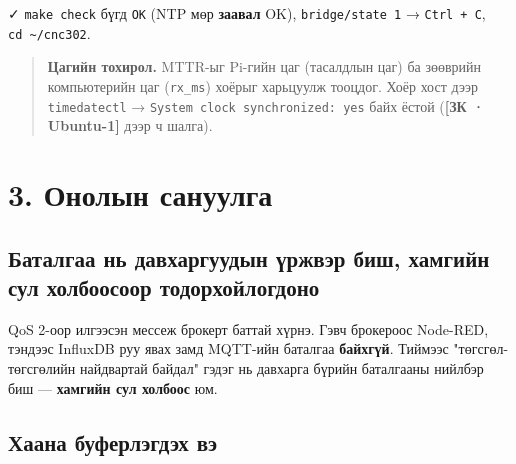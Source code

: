 ✓ \texttt{make\ check} бүгд \texttt{OK} (NTP мөр \textbf{заавал} OK), \texttt{bridge/state\ 1} → \texttt{Ctrl\ +\ C}, \texttt{cd\ \textasciitilde{}/cnc302}.

\begin{quote}
\textbf{Цагийн тохирол.} MTTR-ыг Pi-гийн цаг (тасалдлын цаг) ба зөөврийн компьютерийн цаг (\texttt{rx\_ms}) хоёрыг харьцуулж тооцдог. Хоёр хост дээр \texttt{timedatectl} → \texttt{System\ clock\ synchronized:\allowbreak{}\ yes} байх ёстой (\textbf{{[}ЗК · Ubuntu-1{]}} дээр ч шалга).
\end{quote}

\hypertarget{ux43eux43dux43eux43bux44bux43d-ux441ux430ux43dux443ux443ux43bux433ux430}{%
\section{3. Онолын сануулга}\label{ux43eux43dux43eux43bux44bux43d-ux441ux430ux43dux443ux443ux43bux433ux430}}

\hypertarget{ux431ux430ux442ux430ux43bux433ux430ux430-ux43dux44c-ux434ux430ux432ux445ux430ux440ux433ux443ux443ux434ux44bux43d-ux4afux440ux436ux432ux44dux440-ux431ux438ux448-ux445ux430ux43cux433ux438ux439ux43d-ux441ux443ux43b-ux445ux43eux43bux431ux43eux43eux441ux43eux43eux440-ux442ux43eux434ux43eux440ux445ux43eux439ux43bux43eux433ux434ux43eux43dux43e}{%
\subsection{Баталгаа нь давхаргуудын үржвэр биш, хамгийн сул холбоосоор тодорхойлогдоно}\label{ux431ux430ux442ux430ux43bux433ux430ux430-ux43dux44c-ux434ux430ux432ux445ux430ux440ux433ux443ux443ux434ux44bux43d-ux4afux440ux436ux432ux44dux440-ux431ux438ux448-ux445ux430ux43cux433ux438ux439ux43d-ux441ux443ux43b-ux445ux43eux43bux431ux43eux43eux441ux43eux43eux440-ux442ux43eux434ux43eux440ux445ux43eux439ux43bux43eux433ux434ux43eux43dux43e}}

QoS 2-оор илгээсэн мессеж брокерт баттай хүрнэ. Гэвч брокероос Node-RED, тэндээс InfluxDB руу явах замд MQTT-ийн баталгаа \textbf{байхгүй}. Тиймээс "төгсгөл-төгсгөлийн найдвартай байдал" гэдэг нь давхарга бүрийн баталгааны нийлбэр биш --- \textbf{хамгийн сул холбоос} юм.

\hypertarget{ux445ux430ux430ux43dux430-ux431ux443ux444ux435ux440ux43bux44dux433ux434ux44dux445-ux432ux44d}{%
\subsection{Хаана буферлэгдэх вэ}\label{ux445ux430ux430ux43dux430-ux431ux443ux444ux435ux440ux43bux44dux433ux434ux44dux445-ux432ux44d}}

